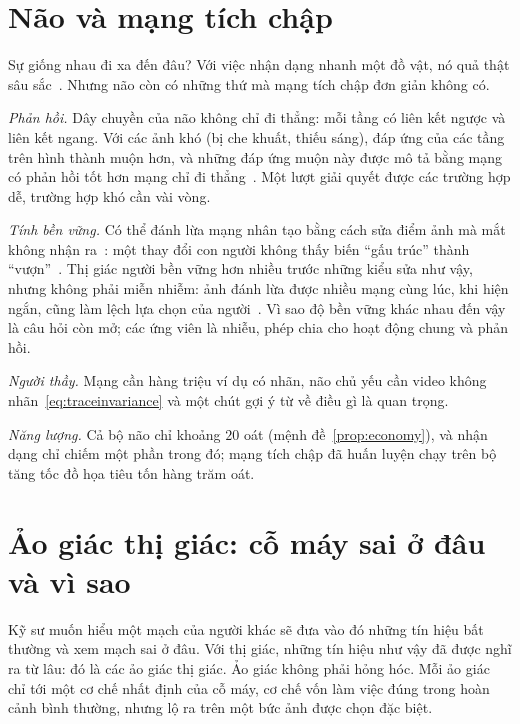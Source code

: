 \section{Não và mạng tích chập}

Sự giống nhau đi xa đến đâu? Với việc nhận dạng nhanh một đồ vật, nó quả thật sâu sắc~\cite{Yamins2014}. Nhưng não còn có những thứ mà mạng tích chập đơn giản không có.

\emph{Phản hồi.} Dây chuyền của não không chỉ đi thẳng: mỗi tầng có liên kết ngược và liên kết ngang. Với các ảnh khó (bị che khuất, thiếu sáng), đáp ứng của các tầng trên hình thành muộn hơn, và những đáp ứng muộn này được mô tả bằng mạng có phản hồi tốt hơn mạng chỉ đi thẳng~\cite{Kar2019}. Một lượt giải quyết được các trường hợp dễ, trường hợp khó cần vài vòng.

\emph{Tính bền vững.} Có thể đánh lừa mạng nhân tạo bằng cách sửa điểm ảnh mà mắt không nhận ra~\cite{Szegedy2014}: một thay đổi con người không thấy biến ``gấu trúc'' thành ``vượn''~\cite{Goodfellow2015}. Thị giác người bền vững hơn nhiều trước những kiểu sửa như vậy, nhưng không phải miễn nhiễm: ảnh đánh lừa được nhiều mạng cùng lúc, khi hiện ngắn, cũng làm lệch lựa chọn của người~\cite{Elsayed2018}. Vì sao độ bền vững khác nhau đến vậy là câu hỏi còn mở; các ứng viên là nhiễu, phép chia cho hoạt động chung và phản hồi.

\emph{Người thầy.} Mạng cần hàng triệu ví dụ có nhãn, não chủ yếu cần video không nhãn~\eqref{eq:traceinvariance} và một chút gợi ý từ  về điều gì là quan trọng.

\emph{Năng lượng.} Cả bộ não chỉ khoảng $20$ oát (mệnh đề~\ref{prop:economy}), và nhận dạng chỉ chiếm một phần trong đó; mạng tích chập đã huấn luyện chạy trên bộ tăng tốc đồ họa tiêu tốn hàng trăm oát.

\section{Ảo giác thị giác: cỗ máy sai ở đâu và vì sao}
\label{sec:illusions}

Kỹ sư muốn hiểu một mạch của người khác sẽ đưa vào đó những tín hiệu bất thường và xem mạch sai ở đâu. Với thị giác, những tín hiệu như vậy đã được nghĩ ra từ lâu: đó là các ảo giác thị giác. Ảo giác không phải hỏng hóc. Mỗi ảo giác chỉ tới một cơ chế nhất định của cỗ máy, cơ chế vốn làm việc đúng trong hoàn cảnh bình thường, nhưng lộ ra trên một bức ảnh được chọn đặc biệt.

